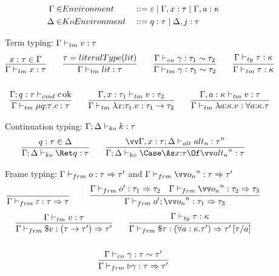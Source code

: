 \documentclass{article}
\begin{document}
\begin{figure}
\centering
\begin{align*}
  \Gamma \in& Environment
  &
  &::= \varepsilon
  \mid \Gamma, x : \tau
  \mid \Gamma, a : \kappa
  \\
  \Delta \in& KoEnvironment
  &
  &::= q : \tau
  \mid \Delta, j : \tau
\end{align*}

Term typing: $\Gamma \vdash_{tm} v : \tau$
\begin{gather*}
  \infer
  {\typetm{\Gamma}{x}{\ty}}
  {x:\ty \in \Gamma}
  \qquad
  \infer
  {\typetm{\Gamma}{\lit}{\ty}}
  {\ty = literalType(\lit)}
  \qquad
  \infer
  {\typetm{\Gamma}{\cn}{\eqty{\ty_1}{\ty_2}}}
  {\typecn{\Gamma}{\cn}{\eqty{\ty_1}{\ty_2}}}
  \qquad
  \infer
  {\typetm{\Gamma}{\ty}{\ki}}
  {\typety{\Gamma}{\ty}{\ki}}
  \\\\
  \infer
  {\typetm{\Gamma}{\compute{\ann q \ty} \cmd}{\ty}}
  {\typecmd{\Gamma}{q:\ty}{\cmd}}
  \qquad
  \infer
  {\typetm{\Gamma}{\fn{\ann x {\ty_1}} \tm}{\ty_1 \to \ty_2}}
  {\typetm{\Gamma, x:\ty_1}{\tm}{\ty_2}}
  \qquad
  \infer
  {\typetm{\Gamma}{\fn{\ann a \ki} \tm}{\forall \ann a \ki. \ty}}
  {\typetm{\Gamma, a:\ki}{\tm}{\ty}}
\end{gather*}

Continuation typing: $\Gamma; \Delta \vdash_{ko} k : \tau$
\begin{gather*}
  \infer
  {\typeko{\Gamma}{\Delta}{\ret q}{\ty}}
  {q:\ty \in \Delta}
  \qquad
  \infer
  {\typeko{\Gamma}{\Delta}{\caseas{\ann x \ty}{\vect[n]{\analt_n}}}{\ty}}
  {
    \vect[n]{
      \typealt{\Gamma, x:\ty}{\Delta}{\analt_n}{\ty}
    }
  }
\end{gather*}

Frame typing: $\Gamma \vdash_{frm} o : \tau \Rightarrow \tau'$ and
$\typefrm{\Gamma}{\vect[n]{\frm_n}}{\ty}{\ty'}$
\begin{gather*}
  \axiom{\typefrm{\Gamma}{\mt}{\ty}{\ty}}
  \qquad
  \infer
  {\typefrm{\Gamma}{\frm' \then \vect[n]{\frm_n}}{\ty_1}{\ty_3}}
  {
    \typefrm{\Gamma}{\frm'}{\ty_1}{\ty_2}
    &
    \typefrm{\Gamma}{\vect[n]{\frm_n}}{\ty_2}{\ty_3}
  }
\end{gather*}
\begin{gather*}
  \infer
  {\typefrm{\Gamma}{\appto{\tm}}{(\ty \to \ty')}{\ty'}}
  {\typetm{\Gamma}{\tm}{\ty}}
  \qquad
  \infer
  {\typefrm{\Gamma}{\inst{\ty}}{(\forall a:\ki.\ty')}{\ty'\subst{a}{\ty}}}
  {\typety{\Gamma}{\ty}{\ki}}
  \\\\
  \infer
  {\typefrm{\Gamma}{\castby{\cn}}{\ty}{\ty'}}
  {\typecn{\Gamma}{\cn}{\eqty{\ty}{\ty'}}}
\end{gather*}


\end{figure}
\end{document}
